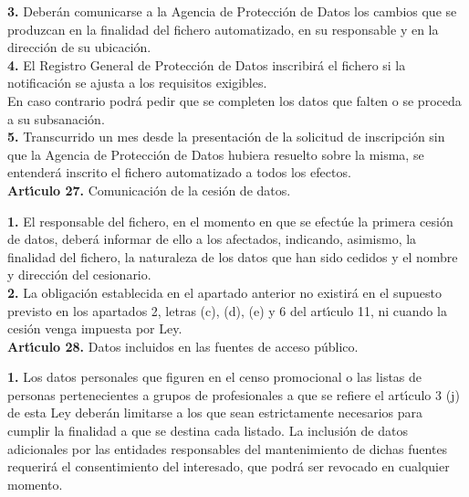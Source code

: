 {\bf 3.} Deber\'an comunicarse a la Agencia de Protecci\'on de Datos los 
cambios que se produzcan en la finalidad del fichero automatizado, en su 
responsable y en la direcci\'on de su ubicaci\'on.\\

{\bf 4.} El Registro General de Protecci\'on de Datos inscribir\'a el fichero 
si la notificaci\'on se ajusta a los requisitos exigibles.\\
En caso contrario podr\'a pedir que se completen los datos que falten o se 
proceda a su subsanaci\'on.\\

{\bf 5.} Transcurrido un mes desde la presentaci\'on de la solicitud de 
inscripci\'on sin que la Agencia de Protecci\'on de Datos hubiera resuelto 
sobre la misma, se entender\'a inscrito el fichero automatizado a todos los 
efectos.
\vspace{0.3cm}\\
{\large {\bf Art\'{\i}culo 27.} Comunicaci\'on de la cesi\'on de datos.}

{\bf 1.} El responsable del fichero, en el momento en que se efect\'ue la 
primera cesi\'on de datos, deber\'a informar de ello a los afectados, indicando,
asimismo, la finalidad del fichero, la naturaleza de los datos que han sido 
cedidos y el nombre y direcci\'on del cesionario.\\

{\bf 2.} La obligaci\'on establecida en el apartado anterior no existir\'a en 
el supuesto previsto en los apartados 2, letras (c), (d), (e) y 6 del 
art\'{\i}culo 11, ni cuando la cesi\'on venga impuesta por Ley.
\vspace{0.3cm}\\
{\large {\bf Art\'{\i}culo 28.} Datos incluidos en las fuentes de acceso 
p\'ublico.}

{\bf 1.} Los datos personales que figuren en el censo promocional o las listas 
de personas pertenecientes a grupos de profesionales a que se refiere el 
art\'{\i}culo 3 (j) de esta Ley deber\'an limitarse a los que sean 
estrictamente necesarios para cumplir la finalidad a que se destina cada 
listado. La inclusi\'on de datos adicionales por las entidades responsables del 
mantenimiento de dichas fuentes requerir\'a el consentimiento del interesado, 
que podr\'a ser revocado en cualquier momento.\\

